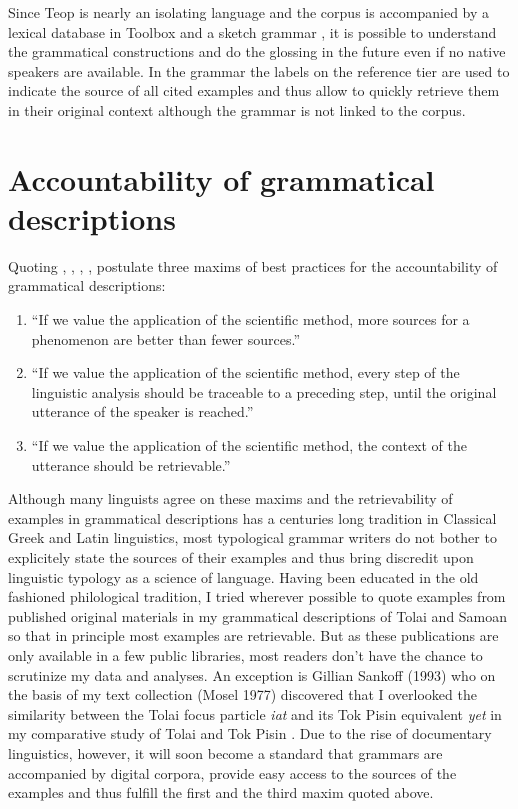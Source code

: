Since Teop is nearly an isolating language and the corpus is accompanied by a lexical database in Toolbox and a sketch grammar \citep{Mosel2007}, it is possible to understand the grammatical constructions and do the glossing in the future even if no native speakers are available. In the grammar the labels on the reference tier are used to indicate the source of all cited examples and thus allow to quickly retrieve them in their original context although the grammar is not linked to the corpus. 

\section{Accountability of grammatical descriptions }%


Quoting \citet{Nordhoff2008}, \citet[395]{Rice2006}, \citet[355]{Noonan2006}, \citet[450]{Weber2006},  \citet[{\S}8.4.1]{Bendertv}  postulate three maxims of best practices for the accountability of grammatical descriptions:

\begin{enumerate}
\item {``If we value the application of the scientific method, more sources for a phenomenon are better than fewer sources.''}
\item {``If we value the application of the scientific method, every step of the linguistic analysis should be traceable to a preceding step, until the original utterance of the speaker is reached.''}
\item {``If we value the application of the scientific method, the context of the utterance should be retrievable.''}
\end{enumerate}

Although many linguists agree on these maxims and the retrievability of examples in grammatical descriptions has a centuries long tradition in Classical Greek and Latin linguistics, most typological grammar writers do not bother to explicitely state the sources of their examples and thus bring discredit upon linguistic typology as a science of language. Having been educated in the old fashioned philological tradition, I tried wherever possible to quote examples from published original materials in my grammatical descriptions of Tolai and Samoan \citep{Mosel1984,MoselEtAl1992} so that in principle most examples are retrievable. But as these publications are only available in a few public libraries, most readers don't have the chance to scrutinize my data and analyses. An exception is Gillian Sankoff (1993) \nocite{Sankoff1993} who on the basis of my text collection (Mosel 1977) discovered that I overlooked the similarity between the Tolai focus particle \textit{iat }and its Tok Pisin equivalent \textit{yet} in my comparative study of Tolai and Tok Pisin \citep{Mosel1980}. Due to the rise of documentary linguistics, however, it will soon become a standard that grammars are accompanied by digital corpora, provide easy access to the sources of the examples and thus fulfill the first and the third maxim quoted above.

